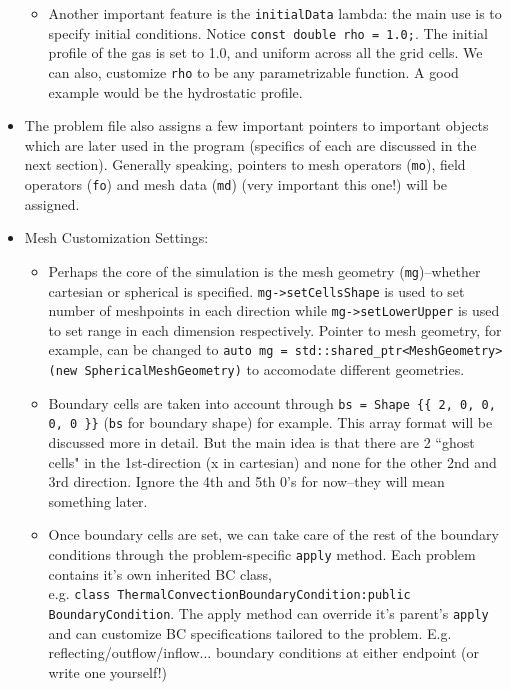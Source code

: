 \documentclass{article}
\begin{document}
\begin{itemize}
\begin{itemize}
		\item Another important feature is the \texttt{initialData} lambda: the main use is to specify initial conditions. Notice \texttt{const double rho = 1.0;}. The initial profile of the gas is set to 1.0, and uniform across all the grid cells. We can also, customize \texttt{rho} to be any parametrizable function. A good example would be the hydrostatic profile. 
		
	\end{itemize}		
	
	
	\item The problem file also assigns a few important pointers to important objects which are later used in the program (specifics of each are discussed in the next section). Generally speaking, pointers to mesh operators (\texttt{mo}), field operators (\texttt{fo}) and mesh data (\texttt{md}) (very important this one!) will be assigned.
	
	\item Mesh Customization Settings:
	\begin{itemize}	
		\item Perhaps the core of the simulation is the mesh geometry (\texttt{mg})--whether cartesian or spherical is specified. \texttt{mg->setCellsShape} is used to set number of meshpoints in each direction while \texttt{mg->setLowerUpper} is used to set range in each dimension respectively. Pointer to mesh geometry, for example, can be changed to \texttt{auto mg = std::shared\_ptr<MeshGeometry> (new SphericalMeshGeometry)} to accomodate different geometries.
		
		\item Boundary cells are taken into account through \texttt{bs = Shape \{\{ 2, 0, 0, 0, 0 \}\}} (\texttt{bs} for boundary shape) for example. This array format will be discussed more in detail. But the main idea is that there are 2 ``ghost cells" in the 1st-direction (x in cartesian) and none for the other 2nd and 3rd direction. Ignore the 4th and 5th 0's for now--they will mean something later. 
		
		\item Once boundary cells are set, we can take care of the rest of the boundary conditions through the problem-specific \texttt{apply} method. Each problem contains it's own inherited BC class, \\
	e.g. \texttt{class ThermalConvectionBoundaryCondition:public BoundaryCondition}. The apply method can override it's parent's \texttt{apply} and can customize BC specifications tailored to the problem. E.g. reflecting/outflow/inflow... boundary conditions at either endpoint (or write one yourself!)   
		

\end{itemize}
\end{itemize}
\end{document}
